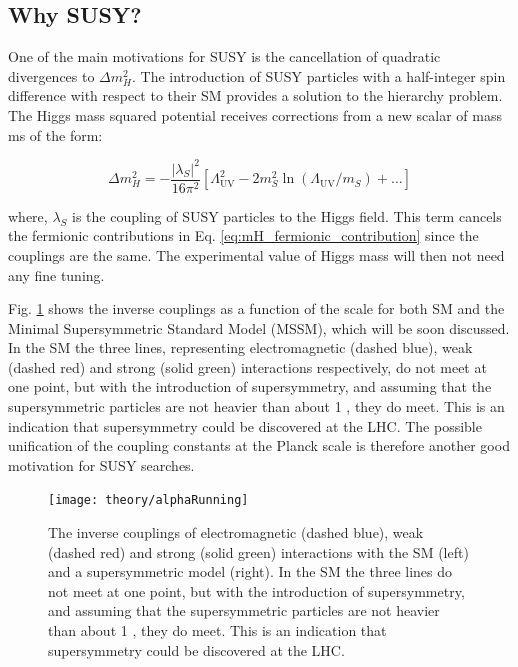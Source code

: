 		

		\subsection{Why SUSY?}

			One of the main motivations for SUSY is the cancellation of quadratic divergences to $\Delta m_H^2$. 
			The introduction of SUSY particles with a half-integer spin difference with respect to their SM provides a solution to the hierarchy problem. The Higgs mass squared potential receives corrections from a new scalar of mass ms of the form:

			\begin{equation}
			\label{eq:mH_scalar_contribution}
			\Delta m_H^2 = - \frac{\left | \lambda_S \right |^2}{16 \pi ^2} \left [  \Lambda_{\mathrm{UV}}^2 - 2m_S^2 \ln \left (\Lambda_{\mathrm{UV}} / m_S \right) + \dots \right ]
			\end{equation}

			\noindent where, $\lambda_S$ is the coupling of SUSY particles to the Higgs field. This term cancels the fermionic contributions in Eq. \ref{eq:mH_fermionic_contribution} since the couplings are the same. The experimental value of Higgs mass will then not need any fine tuning.

			Fig. \ref{fig:alphaRunning} shows the inverse couplings as a function of the scale for both SM and the Minimal Supersymmetric Standard Model (MSSM), which will be soon discussed. In the SM the three lines, representing electromagnetic (dashed blue), weak (dashed red) and strong (solid green) interactions respectively, do not meet at one point, but with the introduction of supersymmetry, and assuming that the supersymmetric particles are not heavier than about 1 \TeV, they do meet. This is an indication that supersymmetry could be discovered at the LHC. The possible unification of the coupling constants at the Planck scale is therefore another good motivation for SUSY searches. 

			\begin{figure}[!htb]
				\centering
				\texttt{[image: theory/alphaRunning]}
				\caption{\label{fig:alphaRunning} The inverse couplings of electromagnetic (dashed blue), weak (dashed red) and strong (solid green) interactions with the SM (left) and a supersymmetric model (right). In the SM the three lines do not meet at one point, but with the introduction of supersymmetry, and assuming that the supersymmetric particles are not heavier than about 1 \TeV, they do meet. This is an indication that supersymmetry could be discovered at the LHC.}
			\end{figure}



